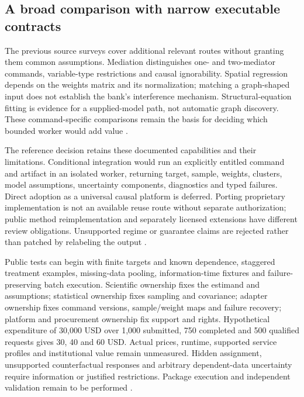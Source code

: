 \subsection{A broad comparison with narrow executable contracts}
The previous source surveys cover additional relevant routes without
granting them common assumptions. Mediation distinguishes one- and
two-mediator commands, variable-type restrictions and causal ignorability.
Spatial regression depends on the weights matrix and its normalization;
matching a graph-shaped input does not establish the bank's interference
mechanism. Structural-equation fitting is evidence for a supplied-model
path, not automatic graph discovery. These command-specific comparisons
remain the basis for deciding which bounded worker would add value
\citep{exec13_ci_stata_mediate,exec20_med_stata_multiple,
exec20_network_stata_spregress,exec13_stata_sem,exec24_stata_choice}.

The reference decision retains these documented capabilities and their
limitations. Conditional integration would run an explicitly entitled
command and artifact in an isolated worker, returning target, sample,
weights, clusters, model assumptions, uncertainty components, diagnostics
and typed failures. Direct adoption as a universal causal platform is
deferred. Porting proprietary implementation is not an available reuse route
without separate authorization; public method reimplementation and
separately licensed extensions have different review obligations.
Unsupported regime or guarantee claims are rejected rather than patched
by relabeling the output \citep{exec13_ivrd_license,exec24_stata_choice}.

Public tests can begin with finite targets and known dependence, staggered
treatment examples, missing-data pooling, information-time fixtures and
failure-preserving batch execution. Scientific ownership fixes the estimand
and assumptions; statistical ownership fixes sampling and covariance;
adapter ownership fixes command versions, sample/weight maps and failure
recovery; platform and procurement ownership fix support and rights.
Hypothetical expenditure of 30,000 USD over 1,000 submitted, 750 completed
and 500 qualified requests gives 30, 40 and 60 USD. Actual prices, runtime,
supported service profiles and institutional value remain unmeasured.
Hidden assignment, unsupported counterfactual responses and arbitrary
dependent-data uncertainty require information or justified restrictions.
Package execution and independent validation remain to be performed \citep{exec24_stata_choice}.
